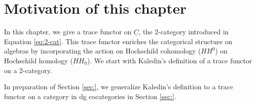 \section{Motivation of this chapter}
In this chapter, we give a trace functor 
on $\underline{C}$, the 2-category 
introduced in Equation 
\ref{eq:2-cat}. This trace functor enriches 
the categorical structure on algebras by 
incorporating the action on Hochschild 
cohomology ($HH^0$) on Hochschild homology 
($HH_0$). We start with Kaledin's definition 
of a trace functor on a 2-category.

In preparation of Section \ref{sec:}, we 
generalize Kaledin's definition to a 
trace functor on a category in dg cocategories 
in Section \ref{sec:}.